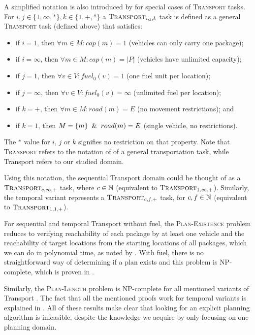 A simplified notation is also introduced by \citet{Helmert2001a} for special cases of \textsc{Transport} tasks.
For $i,j \in \{1, \infty, *\}, k \in \{1, +, *\}$ a $\textsc{Transport}_{i,j,k}$ task is defined as a
general \textsc{Transport} task (defined above) that satisfies:
\begin{itemize}
\item if $i=1$, then $\forall m \in M : cap(m) = 1$ (vehicles can only carry one package);
\item if $i=\infty$, then $\forall m \in M : cap(m) = |P|$ (vehicles have unlimited capacity);
\item if $j=1$, then $\forall v \in V : fuel_0(v) = 1$ (one fuel unit per location);
\item if $j=\infty$, then $\forall v \in V : fuel_0(v) = \infty$ (unlimited fuel per location);
\item if $k=+$, then $\forall m \in M : road(m) = E$ (no movement restrictions); and
\item if $k=1$, then $M = \{m\} \And road(m) = E$ (single vehicle, no restrictions).
\end{itemize}
The $*$ value for $i$, $j$ or $k$ signifies no restriction on that property.
Note that
\textsc{Transport} refers to the notation of \citet{Helmert2001a} of a general transportation
task, while Transport refers to our studied domain.

Using this notation, the sequential Transport domain could be thought of as a $\textsc{Transport}_{c,\infty,+}$ task, where $c \in \mathbb{N}$
(equivalent to $\textsc{Transport}_{1,\infty,+}$).
Similarly, the temporal variant represents a $\textsc{Transport}_{c,f,+}$ task, for $c, f \in \mathbb{N}$
(equivalent to $\textsc{Transport}_{1,1,+}$).

For sequential and temporal Transport without fuel, the \textsc{Plan-Existence} problem
reduces to verifying reachability of each package by at least one vehicle
and the reachability of target locations from the starting locations of all packages,
which we can do in polynomial time, as noted by \citet[Theorem 8]{Helmert2001}.
With fuel, there is no straightforward way of determining
if a plan exists and this problem is NP-complete, which is proven in \citet[Theorem 9 and 10]{Helmert2001}.

Similarly, the \textsc{Plan-Length} problem is NP-complete for all mentioned variants of Transport
\citep[Section~3.6]{Helmert2001a}.
The fact that all the mentioned proofs work for temporal variants is explained in \citet[Section~3.5]{Helmert2001a}.
All of these results make clear that looking for an explicit planning algorithm is infeasible,
despite the knowledge we acquire by only focusing on one planning domain.















